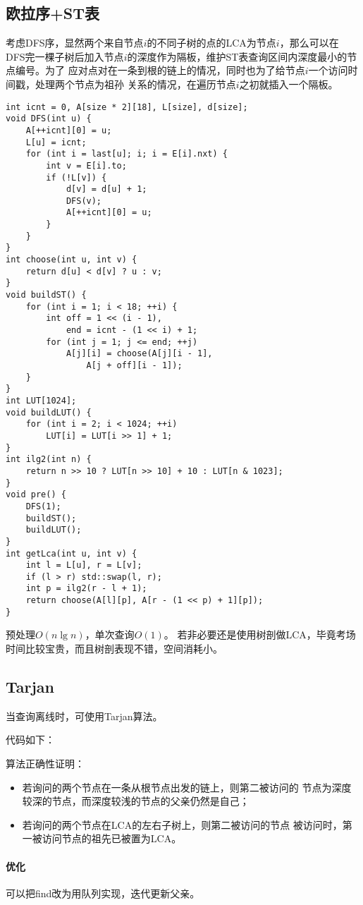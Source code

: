 \subsection{欧拉序+ST表}
考虑DFS序，显然两个来自节点$i$的不同子树的点的LCA为节点$i$，那么可以在
DFS完一棵子树后加入节点$i$的深度作为隔板，维护ST表查询区间内深度最小的节点编号。为了
应对点对在一条到根的链上的情况，同时也为了给节点$i$一个访问时间戳，处理两个节点为祖孙
关系的情况，在遍历节点$i$之初就插入一个隔板。
\begin{lstlisting}
int icnt = 0, A[size * 2][18], L[size], d[size];
void DFS(int u) {
    A[++icnt][0] = u;
    L[u] = icnt;
    for (int i = last[u]; i; i = E[i].nxt) {
        int v = E[i].to;
        if (!L[v]) {
            d[v] = d[u] + 1;
            DFS(v);
            A[++icnt][0] = u;
        }
    }
}
int choose(int u, int v) {
    return d[u] < d[v] ? u : v;
}
void buildST() {
    for (int i = 1; i < 18; ++i) {
        int off = 1 << (i - 1),
            end = icnt - (1 << i) + 1;
        for (int j = 1; j <= end; ++j)
            A[j][i] = choose(A[j][i - 1],
                A[j + off][i - 1]);
    }
}
int LUT[1024];
void buildLUT() {
    for (int i = 2; i < 1024; ++i)
        LUT[i] = LUT[i >> 1] + 1;
}
int ilg2(int n) {
    return n >> 10 ? LUT[n >> 10] + 10 : LUT[n & 1023];
}
void pre() {
    DFS(1);
    buildST();
    buildLUT();
}
int getLca(int u, int v) {
    int l = L[u], r = L[v];
    if (l > r) std::swap(l, r);
    int p = ilg2(r - l + 1);
    return choose(A[l][p], A[r - (1 << p) + 1][p]);
}
\end{lstlisting}

预处理$O(n\lg n)$，单次查询$O(1)$。
若非必要还是使用树剖做LCA，毕竟考场时间比较宝贵，而且树剖表现不错，空间消耗小。
\subsection{Tarjan}
当查询离线时，可使用Tarjan算法。

代码如下：


算法正确性证明：
\begin{itemize}
    \item 若询问的两个节点在一条从根节点出发的链上，则第二被访问的
    节点为深度较深的节点，而深度较浅的节点的父亲仍然是自己；
    \item 若询问的两个节点在LCA的左右子树上，则第二被访问的节点
    被访问时，第一被访问节点的祖先已被置为LCA。
\end{itemize}

\paragraph{优化} 可以把find改为用队列实现，迭代更新父亲。
